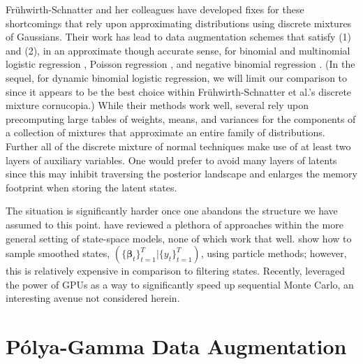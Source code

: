 \documentclass[12pt]{article}
\newcommand{\Polya}{P\'{o}lya}
\newcommand{\bbeta}{\boldsymbol{\beta}}
\newcounter{parnum}
\newcommand{\npoint}{%
  \noindent\refstepcounter{parnum}%
  \makebox[0.5in][c]{\textbf{\arabic{parnum}.}} %
  \marginnote{\small\ttfamily\the\inputlineno}}
\renewcommand{\npoint}{}
\begin{document}
\npoint Fr\"{u}hwirth-Schnatter and her colleagues have developed fixes for
these shortcomings that rely upon approximating distributions using discrete
mixtures of Gaussians.  Their work has lead to data augmentation schemes that
satisfy (1) and (2), in an approximate though accurate sense, for binomial and
multinomial logistic regression \citep{fruhwirth-schnatter-fruhwirth-2007,
  fruhwirth-schnatter-fruhwirth-2010, fussl-etal-2013}, Poisson regression
\citep{fruhwirth-schnatter-wagner-2006, fruhwirth-schnatter-etal-2009}, and
negative binomial regression \citep{fruhwirth-schnatter-etal-2009}.  (In the
sequel, for dynamic binomial logistic regression, we will limit our comparison
to \cite{fussl-etal-2013} since it appears to be the best choice within
Fr\"{u}hwirth-Schnatter et al.'s discrete mixture cornucopia.)
\npoint While their methods work well, several rely upon precomputing large
tables of weights, means, and variances for the components of a collection of
mixtures that approximate an entire family of distributions.  Further all of the
discrete mixture of normal techniques make use of at least two layers of
auxiliary variables.  One would prefer to avoid many layers of latents since
this may inhibit traversing the posterior landscape and enlarges the memory
footprint when storing the latent states.

\npoint The situation is significantly harder once one abandons the structure we
have assumed to this point.  \cite{geweke-tanizaki-2001} have reviewed a
plethora of approaches within the more general setting of state-space models,
none of which work that well.  \cite{godsill-etal-2004} show how to sample
smoothed states, $(\{\bbeta_t\}_{t=1}^T | \{y_t\}_{t=1}^T)$, using particle
methods; however, this is relatively expensive in comparison to filtering
states.  Recently, \cite{geweke-etal-2013} leveraged the power of GPUs as a way
to significantly speed up sequential Monte Carlo, an interesting avenue not
considered herein.

\section{\Polya-Gamma Data Augmentation}
\label{sec:pg}
\end{document}
